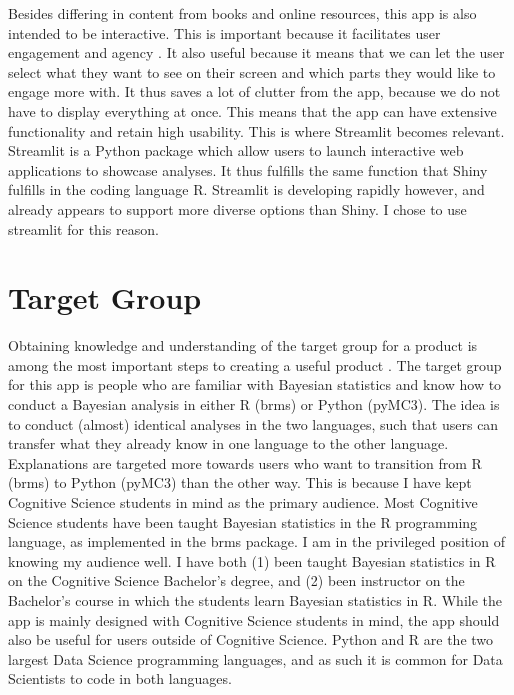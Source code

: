 \documentclass[12pt]{article}
\begin{document}
Besides differing in content from books and online resources, this app is also intended
to be interactive. This is important because it facilitates user engagement and
agency \autocite{janlert2017meaning}.
It also useful because it means that we can let the user select what they want to see on
their screen and which parts they would like to engage more with. It thus saves a lot of
clutter from the app, because we do not have to display everything at once.
This means that the app can have extensive functionality and retain high
usability.
This is where Streamlit becomes relevant. Streamlit is a Python package which allow users
to launch interactive web applications to showcase analyses. It thus fulfills the same function
that Shiny fulfills in the coding language R. Streamlit is developing rapidly however,
and already appears to support more diverse options than Shiny. I chose to use
streamlit for this reason.

\section{Target Group}
Obtaining knowledge and understanding of the target group for a product is among the
most important steps to creating a useful product
\autocite[13]{mills1992macintosh}.
The target group for this app is people who are familiar with Bayesian statistics and know
how to conduct a Bayesian analysis in either R (brms) or Python (pyMC3). The idea is to
conduct (almost) identical analyses in the two languages, such that users can
transfer what they already know in one language to the other language.
Explanations are targeted more towards users who want to transition from R (brms)
to Python (pyMC3) than the other way. This is because I have kept Cognitive Science students
in mind as the primary audience. Most Cognitive Science students have been
taught Bayesian statistics in the R programming language, as implemented in the
brms package. I am in the privileged position of knowing my audience well. I
have both (1) been taught Bayesian statistics in R on the Cognitive Science
Bachelor's degree, and (2) been instructor on the Bachelor's course in which
the students learn Bayesian statistics in R.
While the app is mainly designed with Cognitive Science students in mind,
the app should also be useful for users outside of Cognitive Science.
Python and R are the two largest Data Science programming
languages, and as such it is common for Data Scientists to code in both
languages.
\end{document}
